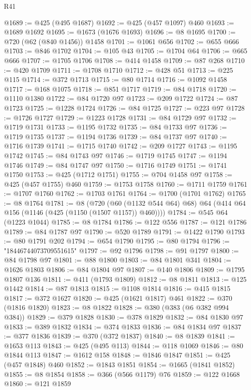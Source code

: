 \begin{lexlean}{R41}
\begin{coremodule}
@1689 := @425 (@495 @1687)
@1692 := @425 (@457 @1097) @460
@1693 := @1689 @1692
@1695 := @1673 (@1676 @1693)
@1696 := @8 @1695
@1700 := @720 (@62 (@840 @1456)) @1458
@1701 := @1061 @656
@1702 := @655 @666
@1703 := @846 @1702
@1704 := @105 @43
@1705 := @1704 @64
@1706 := @665 @666
@1707 := @1705 @1706
@1708 := @414 @1458
@1709 := @87 @268
@1710 := @420 @1709
@1711 := @1708 @1710
@1712 := @428 @51
@1713 := @225 @115
@1714 := @372 @1713
@1715 := @80 @1714
@1716 := @1092 @1458
@1717 := @168 @1075
@1718 := @851 @1717
@1719 := @84 @1718
@1720 := @1110 @1380
@1722 := @84 @1720 @97
@1723 := @209 @1722
@1724 := @87 @1723
@1725 := @1228 @1724
@1726 := @84 @1725
@1727 := @223 @97
@1728 := @1726 @1727
@1729 := @1223 @1728
@1731 := @84 @1729 @97
@1732 := @1719 @1731
@1733 := @1195 @1732
@1735 := @84 @1733 @97
@1736 := @1719 @1735
@1737 := @1194 @1736
@1739 := @84 @1737 @97
@1740 := @1716 @1739
@1741 := @1715 @1740
@1742 := @209 @1727
@1743 := @1195 @1742
@1745 := @84 @1743 @97
@1746 := @1719 @1745
@1747 := @1194 @1746
@1749 := @84 @1747 @97
@1750 := @1716 @1749
@1751 := @1741 @1750
@1753 := @425 (@1712 @1751)
@1755 := @704 @1458 @97
@1758 := @425 (@457 @1755) @460
@1759 := @1753 @1758
@1760 := @1711 @1759
@1761 := @1707 @1760
@1762 := @1703 @1761
@1764 := @1700 (@1701 @1762)
@1765 := @8 @1764
@1781 := @8
    (@720 (@60 (@1132 @544 @64) @68) @64 (@414 @64 @156 (@1146 (@425 (@1150 (@1507 @1157)) @460))))
@1784 := @545 @64 (@1223 @1044)
@1785 := @8 @1784
@1786 := @122 @556
@1787 := @121 @1786
@1789 := @84 @1787 @97
@1790 := @520 @1789
@1791 := @1422 @1790
@1793 := @80 @1791 @202
@1794 := @654 @1790
@1795 := @80 @1794
@1796 := "18446744073709551615"
@1797 := @92 @1796
@1798 := @91 @1797
@1800 := @84 @1798 @97
@1801 := @88 @1800
@1803 := @84 @1801 @341
@1804 := @1626 @1803
@1806 := @84 @1804 @97
@1807 := @140 @1806
@1809 := @1795 @1807 @136
@1811 := @411 (@1793 @1809)
@1812 := @8 @1811
@1813 := @125 @1442
@1814 := @87 @1813
@1815 := @1108 @1814
@1816 := @415 @1815
@1817 := @372 @1627
@1820 := @425 (@1621 @1817) @461
@1822 := @370 (@1816 @1820)
@1823 := @8 @1822
@1828 := @380 (@383 (@6 @382 @994 @384))
@1829 := @379 @1828
@1830 := @378 @1829
@1832 := @84 @1830 @97
@1833 := @389 @1832
@1834 := @374 @1833
@1836 := @84 @1834 @97
@1837 := @377 @1836
@1839 := @370 (@372 @1837)
@1840 := @8 @1839
@1841 := @1653 @113
@1843 := @425 (@495 @113)
@1844 := @118 @1069
@1846 := @80 @1844 @113
@1847 := @1612 @158
@1848 := @1846 @1847
@1851 := @425 (@457 @1848) @460
@1852 := @1843 @1851
@1854 := @1665 (@1841 @1852)
@1855 := @8 @1854
@1858 := @366 (@566 @1179) @76
@1859 := @122 @1668
@1860 := @121 @1859

\end{coremodule}
\end{lexlean}
